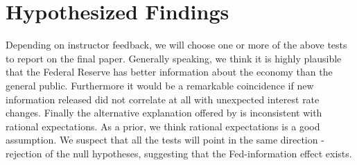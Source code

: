 \documentclass[a4paper,man,floatsintext,natbib]{apa6}
\begin{document}
	\section{Hypothesized Findings}
	Depending on instructor feedback, we will choose one or more of the above tests to report on the final paper. Generally speaking, we think it is highly plausible that the Federal Reserve has better information about the economy than the general public. Furthermore it would be a remarkable coincidence if new information released did not correlate at all with unexpected interest rate changes. Finally the alternative explanation offered by \cite{Bauer2020} is inconsistent with rational expectations. As a prior, we think rational expectations is a good assumption. We suspect that all the tests will point in the same direction - rejection of the null hypotheses, suggesting that the Fed-information effect exists.  
	
\end{document}

